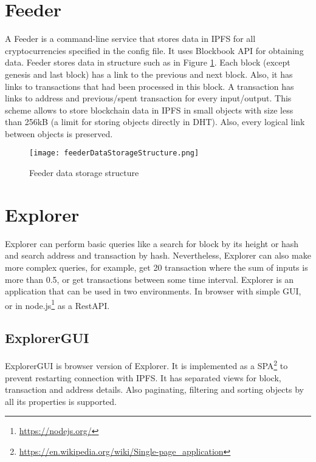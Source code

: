 \section{Feeder}
A Feeder is a command-line service that stores data in IPFS for all cryptocurrencies specified in the config file. It uses Blockbook API for obtaining data. Feeder stores data in structure such as in Figure \ref{feederDataStorageStructure}. Each block (except genesis and last block) has a link to the previous and next block. Also, it has links to transactions that had been processed in this block. A transaction has links to address and previous/spent transaction for every input/output. This scheme allows to store blockchain data in IPFS in small objects with size less than 256kB (a limit for storing objects directly in DHT). Also, every logical link between objects is preserved.

\begin{figure}[h]
    \centering
    \texttt{[image: feederDataStorageStructure.png]}
    \caption{Feeder data storage structure}
    \label{feederDataStorageStructure}
\end{figure}



\section{Explorer}
Explorer can perform basic queries like a search for block by its height or hash and search address and transaction by hash. Nevertheless, Explorer can also make more complex queries, for example, get 20 transaction where the sum of inputs is more than 0.5, or get transactions between some time interval. Explorer is an application that can be used in two environments. In browser with simple GUI, or in node.js\footnote{\url{https://nodejs.org/}} as a RestAPI.

\subsection{ExplorerGUI}
ExplorerGUI is browser version of Explorer. It is implemented as a SPA\footnote{\url{https://en.wikipedia.org/wiki/Single-page_application}} to prevent restarting connection with IPFS. It has separated views for block, transaction and address details. Also paginating, filtering and sorting objects by all its properties is supported.

